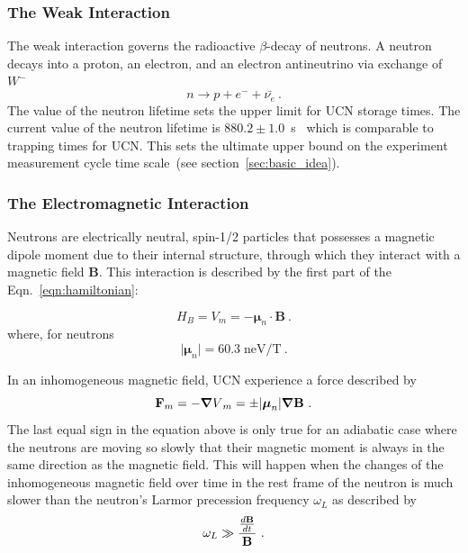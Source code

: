 \subsubsection{The Weak Interaction}
The weak interaction governs the radioactive $\beta$-decay of
neutrons. A neutron decays into a proton, an electron, and an electron
antineutrino via exchange of $W^-$
\label{neutrondecay}
\begin{equation}
n\longrightarrow p+e^{-}+\bar{\nu_{e}}~.
\end{equation}
The value of the neutron lifetime sets the upper limit for UCN storage
times. The current value of the neutron lifetime is
$880.2 \pm 1.0$~s~\cite{PDG2018} which is comparable to trapping times
for UCN. This sets the ultimate upper bound on the experiment
measurement cycle time scale~(see section~\ref{sec:basic_idea}).

\subsubsection{The Electromagnetic Interaction}

Neutrons are electrically neutral, spin-1/2 particles that possesses a
magnetic dipole moment due to their internal structure, through which
they interact with a magnetic field \textbf{B}. This interaction is
described by the first part of the Eqn.~\ref{eqn:hamiltonian}:

\begin{equation}
  \label{eqn:vmag}
H_B = V_m=-\boldsymbol{\mu}_n \cdot \textbf{B}~.
\end{equation}
where, for neutrons
\begin{equation}
\vert \boldsymbol{\mu}_n \vert =60.3 \; \text{neV/T}~.
\end{equation}

In an inhomogeneous magnetic field, UCN experience a force described
by
\begin{equation}
  \label{eqn:fmag}
  {\bf{F}}_m = - {\boldsymbol{\nabla}V}_m = \pm \vert {\boldsymbol{\mu}}_n \vert \boldsymbol{\nabla} \bf{B}~.
\end{equation}
The last equal sign in the equation above is only true for an
adiabatic case where the neutrons are moving so slowly that
their magnetic moment is always in the same direction as the magnetic
field. This will happen when the changes of the inhomogeneous magnetic
field over time in the rest frame of the neutron is much slower than
the neutron's Larmor precession frequency $\omega_L$ as described by
\begin{equation}
\omega_L \gg \frac{\frac{d\bf{B}}{dt}}{\bf{B}}~.
\end{equation}

